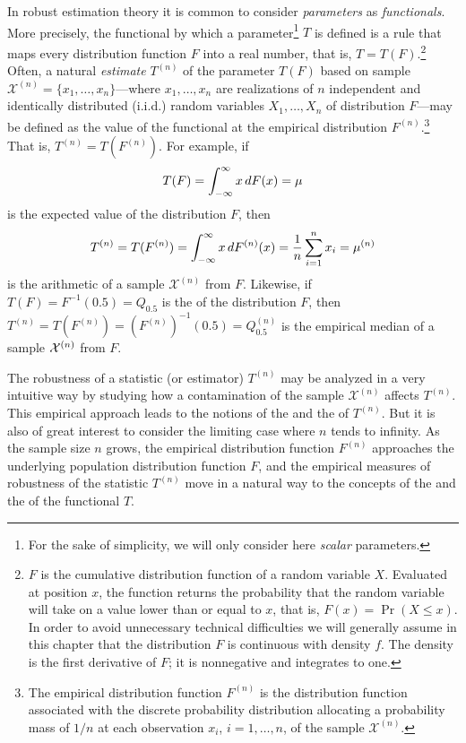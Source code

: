In robust estimation theory it is common to consider \emph{parameters} as
\emph{functionals}. More precisely, the functional by which a
parameter\footnote{For the sake of simplicity, we will only consider here
\emph{scalar} parameters.} $T$ is defined is a rule that maps every
distribution function $F$ into a real number, that is, $T = T(F)$.\footnote{$F$
is the cumulative distribution function of a random variable $X$. Evaluated at
position $x$, the function returns the probability that the random variable
will take on a value lower than or equal to $x$, that is, $F(x) = \Pr(X \leq
x)$. In order to avoid unnecessary technical difficulties we will generally
assume in this chapter that the distribution $F$ is continuous with density
$f$. The density is the first derivative of $F$; it is nonnegative and
integrates to one.} Often, a natural \emph{estimate} $T^{(n)}$ of the parameter
$T(F)$ based on sample ${\mathcal X}^{(n)}= \{x_1, \dots, x_n\}$---where $x_1,
\dots, x_n$ are realizations of $n$ independent and identically distributed
(i.i.d.) random variables $X_1, \dots, X_n$ of distribution $F$---may be
defined as the value of the functional at the empirical distribution
$F^{(n)}$.\footnote{The empirical distribution function $F^{(n)}$ is the
distribution function associated with the discrete probability distribution
allocating a probability mass of $1/n$ at each observation $x_i$,
$i=1,\ldots,n$, of the sample ${\mathcal X}^{(n)}$.} That is, $T^{(n)} =
T(F^{(n)})$. For example, if
\[
    T(F) = \int_{-\infty}^\infty x \mathop{}\!d F(x) = \mu
\]
is the expected value of the distribution $F$, then
\[
    T^{(n)} = T(F^{(n)}) = \int_{-\infty}^\infty x \mathop{}\!d F^{(n)}(x) 
          = \frac{1}{n} \sum_{i=1}^n x_i = \mu^{(n)}
\]
is the arithmetic  of a sample ${\mathcal X}^{(n)}$ from $F$.
Likewise, if $T(F) = F^{-1}(0.5) = Q_{0.5}$ is the  of the
distribution $F$, then $T^{(n)} = T(F^{(n)}) = (F^{(n)})^{-1}(0.5) =
Q_{0.5}^{(n)}$ is the empirical median of a sample ${\cal X}^{(n)}$ from $F$.

The robustness of a statistic (or estimator) $T^{(n)}$ may be analyzed in a very
intuitive way by studying how a contamination of the sample
$\mathcal{X}^{(n)}$ affects $T^{(n)}$. This empirical approach leads to the notions of
the \emph{} and the \emph{} of $T^{(n)}$. But it is also
of great interest to consider the limiting case where $n$ tends to infinity. As
the sample size $n$ grows, the empirical distribution function $F^{(n)}$ approaches
the underlying population distribution function $F$, and the empirical measures
of robustness of the statistic $T^{(n)}$ move in a natural way to the concepts of
the \emph{} and the \emph{} of the functional $T$.


